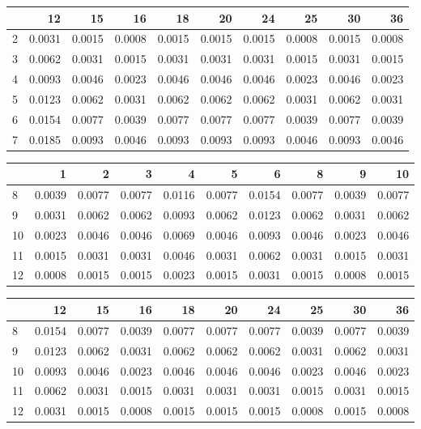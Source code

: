 \documentclass[]{book}
\begin{document}
\begin{tabular}{l|r|r|r|r|r|r|r|r|r}
\hline
  & 12 & 15 & 16 & 18 & 20 & 24 & 25 & 30 & 36\\
\hline
2 & 0.0031 & 0.0015 & 0.0008 & 0.0015 & 0.0015 & 0.0015 & 0.0008 & 0.0015 & 0.0008\\
\hline
3 & 0.0062 & 0.0031 & 0.0015 & 0.0031 & 0.0031 & 0.0031 & 0.0015 & 0.0031 & 0.0015\\
\hline
4 & 0.0093 & 0.0046 & 0.0023 & 0.0046 & 0.0046 & 0.0046 & 0.0023 & 0.0046 & 0.0023\\
\hline
5 & 0.0123 & 0.0062 & 0.0031 & 0.0062 & 0.0062 & 0.0062 & 0.0031 & 0.0062 & 0.0031\\
\hline
6 & 0.0154 & 0.0077 & 0.0039 & 0.0077 & 0.0077 & 0.0077 & 0.0039 & 0.0077 & 0.0039\\
\hline
7 & 0.0185 & 0.0093 & 0.0046 & 0.0093 & 0.0093 & 0.0093 & 0.0046 & 0.0093 & 0.0046\\
\hline
\end{tabular}

\begin{tabular}{l|r|r|r|r|r|r|r|r|r}
\hline
  & 1 & 2 & 3 & 4 & 5 & 6 & 8 & 9 & 10\\
\hline
8 & 0.0039 & 0.0077 & 0.0077 & 0.0116 & 0.0077 & 0.0154 & 0.0077 & 0.0039 & 0.0077\\
\hline
9 & 0.0031 & 0.0062 & 0.0062 & 0.0093 & 0.0062 & 0.0123 & 0.0062 & 0.0031 & 0.0062\\
\hline
10 & 0.0023 & 0.0046 & 0.0046 & 0.0069 & 0.0046 & 0.0093 & 0.0046 & 0.0023 & 0.0046\\
\hline
11 & 0.0015 & 0.0031 & 0.0031 & 0.0046 & 0.0031 & 0.0062 & 0.0031 & 0.0015 & 0.0031\\
\hline
12 & 0.0008 & 0.0015 & 0.0015 & 0.0023 & 0.0015 & 0.0031 & 0.0015 & 0.0008 & 0.0015\\
\hline
\end{tabular}

\begin{tabular}{l|r|r|r|r|r|r|r|r|r}
\hline
  & 12 & 15 & 16 & 18 & 20 & 24 & 25 & 30 & 36\\
\hline
8 & 0.0154 & 0.0077 & 0.0039 & 0.0077 & 0.0077 & 0.0077 & 0.0039 & 0.0077 & 0.0039\\
\hline
9 & 0.0123 & 0.0062 & 0.0031 & 0.0062 & 0.0062 & 0.0062 & 0.0031 & 0.0062 & 0.0031\\
\hline
10 & 0.0093 & 0.0046 & 0.0023 & 0.0046 & 0.0046 & 0.0046 & 0.0023 & 0.0046 & 0.0023\\
\hline
11 & 0.0062 & 0.0031 & 0.0015 & 0.0031 & 0.0031 & 0.0031 & 0.0015 & 0.0031 & 0.0015\\
\hline
12 & 0.0031 & 0.0015 & 0.0008 & 0.0015 & 0.0015 & 0.0015 & 0.0008 & 0.0015 & 0.0008\\
\hline
\end{tabular}
\end{document}
